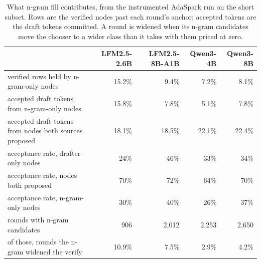 \begin{table}[t]
\centering\small
\caption{What n-gram fill contributes, from the instrumented AdaSpark run on the short subset. Rows are the verified nodes past each round's anchor; accepted tokens are the draft tokens committed. A round is widened when its n-gram candidates move the chooser to a wider class than it takes with them priced at zero.}
\label{tab:ngram}
\setlength{\tabcolsep}{4pt}
\begin{tabular}{lrrrr}
\toprule
\rowcolor{head}\textbf{} & \textbf{LFM2.5-2.6B} & \textbf{LFM2.5-8B-A1B} & \textbf{Qwen3-4B} & \textbf{Qwen3-8B} \\
\midrule
verified rows held by n-gram-only nodes & 15.2\% & 9.4\% & 7.2\% & 8.1\% \\
accepted draft tokens from n-gram-only nodes & 15.8\% & 7.8\% & 5.1\% & 7.8\% \\
accepted draft tokens from nodes both sources proposed & 18.1\% & 18.5\% & 22.1\% & 22.4\% \\
acceptance rate, drafter-only nodes & 24\% & 46\% & 33\% & 34\% \\
acceptance rate, nodes both proposed & 70\% & 72\% & 64\% & 70\% \\
acceptance rate, n-gram-only nodes & 30\% & 40\% & 26\% & 37\% \\
rounds with n-gram candidates & 906 & 2,012 & 2,253 & 2,650 \\
of those, rounds the n-gram widened the verify & 10.9\% & 7.5\% & 2.9\% & 4.2\% \\
\bottomrule
\end{tabular}
\end{table}
